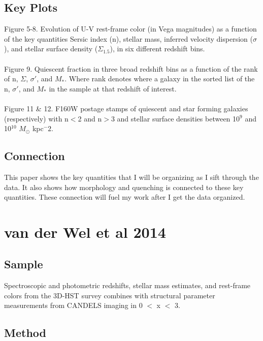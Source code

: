 \documentclass{article}
\begin{document}
\subsection{Key Plots}
Figure 5-8. Evolution of U-V rest-frame color (in Vega magnitudes) as a function of the key quantities Sersic index (n), stellar mass, inferred velocity dispersion ($\sigma$), and stellar surface density ($\Sigma_{1.5}$), in six different redshift bins. \\
\\
Figure 9. Quiescent fraction in three broad redshift bins as a function of the rank of n, $\Sigma$, $\sigma'$, and $M_{*}$. Where rank denotes where a galaxy in the sorted list of the n, $\sigma'$, and $M_{*}$ in the sample at that redshift of interest.\\
\\
Figure 11 \& 12. F160W postage stamps of quiescent and star forming galaxies (respectively) with n$<$2 and n$>$3 and stellar surface densities between 10$^{9}$ and 10$^{10}$ $M_{\odot}$ kpc$^-2$.

\subsection{Connection}
This paper shows the key quantities that I will be organizing as I sift through the data. It also shows how morphology and quenching is connected to these key quantities. These connection will fuel my work after I get the data organized.

\section{van der Wel et al 2014}

\subsection{Sample}
Spectroscopic and photometric redshifts, stellar mass estimates, and rest-frame colors from the 3D-HST survey combines with structural parameter measurements from CANDELS imaging in 0 $<$ x $<$ 3.

\subsection{Method}
\end{document}
